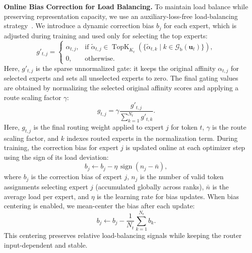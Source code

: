 \noindent\textbf{Online Bias Correction for Load Balancing.}
To maintain load balance while preserving representation capacity, we use an auxiliary-loss-free load-balancing strategy~\cite{wang2024auxlossfree,deepseek2024v3}. We introduce a dynamic correction bias $b_j$ for each expert, which is adjusted during training and used only for selecting the top experts:
\begin{equation}
g'_{t,j} = \begin{cases} \alpha_{t,j}, & \text{if } \tilde{\alpha}_{t,j} \in \operatorname{TopK}_{K_{\mathrm{r}}}(\{\tilde{\alpha}_{t,k} \mid k \in \mathcal{G}_{\mathrm{b}}(\mathbf{u}_t)\}), \\ 0, & \text{otherwise}. \end{cases}
\end{equation}
Here, $g'_{t,j}$ is the sparse unnormalized gate: it keeps the original affinity $\alpha_{t,j}$ for selected experts and sets all unselected experts to zero. The final gating values are obtained by normalizing the selected original affinity scores and applying a route scaling factor $\gamma$:
\begin{equation}
g_{t,j} = \gamma \frac{g'_{t,j}}{\sum_{k=1}^{N_{\mathrm{r}}} g'_{t,k}}.
\end{equation}
Here, $g_{t,j}$ is the final routing weight applied to expert $j$ for token $t$, $\gamma$ is the route scaling factor, and $k$ indexes routed experts in the normalization term.
During training, the correction bias for expert $j$ is updated online at each optimizer step using the sign of its load deviation:
\begin{equation}
b_j \leftarrow b_j - \eta\,\operatorname{sign}(n_j - \bar{n}),
\end{equation}
where $b_j$ is the correction bias of expert $j$, $n_j$ is the number of valid token assignments selecting expert $j$ (accumulated globally across ranks), $\bar{n}$ is the average load per expert, and $\eta$ is the learning rate for bias updates. When bias centering is enabled, we mean-center the bias after each update:
\begin{equation}
b_j \leftarrow b_j - \frac{1}{N_{\mathrm{r}}}\sum_{k=1}^{N_{\mathrm{r}}} b_k.
\end{equation}
This centering preserves relative load-balancing signals while keeping the router input-dependent and stable.

